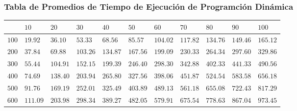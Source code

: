 \documentclass[12pt]{article}
\begin{document}
\subsubsection*{Tabla de Promedios de Tiempo de Ejecuci\'on de Programci\'on Din\'amica}
\begin{tabu}{|@{}*{11}{p{1.4cm}@{}|}}
%
& $10$ & $20$ & $30$ & $40$ & $50$ & $60$ & $70$ & $80$ & $90$ & $100$ \\\hline
$100$ & $19.92$ & $36.10$ & $53.33$ & $68.56$ & $85.57$ & $104.02$ & $117.82$ & $134.76$ & $149.46$ & $165.12$ \\\hline
$200$ & $37.84$ & $69.88$ & $103.26$ & $134.87$ & $167.56$ & $199.09$ & $230.33$ & $264.34$ & $297.60$ & $329.86$ \\\hline
$300$ & $55.44$ & $104.91$ & $152.15$ & $199.39$ & $246.40$ & $298.30$ & $342.88$ & $402.33$ & $441.33$ & $490.56$ \\\hline
$400$ & $74.69$ & $138.40$ & $203.94$ & $265.80$ & $327.56$ & $398.06$ & $451.87$ & $524.54$ & $583.58$ & $656.18$ \\\hline
$500$ & $91.76$ & $169.19$ & $252.01$ & $325.49$ & $403.89$ & $489.13$ & $561.18$ & $655.08$ & $722.43$ & $817.29$ \\\hline
$600$ & $111.09$ & $203.98$ & $298.34$ & $389.27$ & $482.05$ & $579.91$ & $675.54$ & $778.63$ & $867.04$ & $973.45$ \\\hline

\end{tabu}
\end{document}
